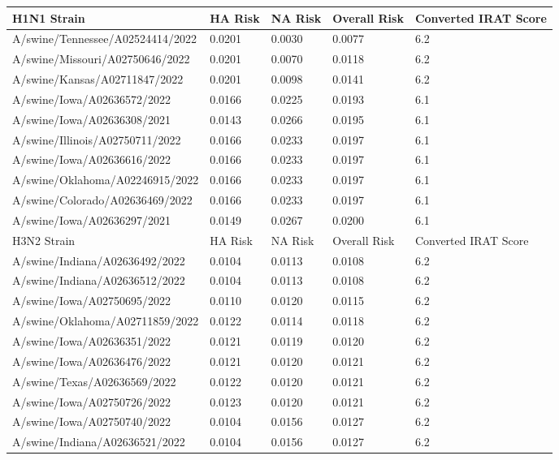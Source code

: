 \begin{tabular}{L{2.1in}|L{0.7in}|L{0.7in}|L{0.7in}|L{1in}}\hline
 H1N1 Strain & HA Risk & NA Risk & Overall Risk & Converted IRAT Score \\\hline
 A/swine/Tennessee/A02524414/2022 &0.0201&0.0030&0.0077&6.2\\\hline
 A/swine/Missouri/A02750646/2022 &0.0201&0.0070&0.0118&6.2\\\hline
 A/swine/Kansas/A02711847/2022 &0.0201&0.0098&0.0141&6.2\\\hline
 A/swine/Iowa/A02636572/2022 &0.0166&0.0225&0.0193&6.1\\\hline
 A/swine/Iowa/A02636308/2021 &0.0143&0.0266&0.0195&6.1\\\hline
 A/swine/Illinois/A02750711/2022 &0.0166&0.0233&0.0197&6.1\\\hline
 A/swine/Iowa/A02636616/2022 &0.0166&0.0233&0.0197&6.1\\\hline
 A/swine/Oklahoma/A02246915/2022 &0.0166&0.0233&0.0197&6.1\\\hline
 A/swine/Colorado/A02636469/2022 &0.0166&0.0233&0.0197&6.1\\\hline
 A/swine/Iowa/A02636297/2021 &0.0149&0.0267&0.0200&6.1\\\hline
 H3N2 Strain & HA Risk & NA Risk & Overall Risk & Converted IRAT Score\\\hline
 A/swine/Indiana/A02636492/2022 &0.0104&0.0113&0.0108&6.2\\\hline
 A/swine/Indiana/A02636512/2022 &0.0104&0.0113&0.0108&6.2\\\hline
 A/swine/Iowa/A02750695/2022 &0.0110&0.0120&0.0115&6.2\\\hline
 A/swine/Oklahoma/A02711859/2022 &0.0122&0.0114&0.0118&6.2\\\hline
 A/swine/Iowa/A02636351/2022 &0.0121&0.0119&0.0120&6.2\\\hline
 A/swine/Iowa/A02636476/2022 &0.0121&0.0120&0.0121&6.2\\\hline
 A/swine/Texas/A02636569/2022 &0.0122&0.0120&0.0121&6.2\\\hline
 A/swine/Iowa/A02750726/2022 &0.0123&0.0120&0.0121&6.2\\\hline
 A/swine/Iowa/A02750740/2022 &0.0104&0.0156&0.0127&6.2\\\hline
 A/swine/Indiana/A02636521/2022 &0.0104&0.0156&0.0127&6.2\\\hline
 \end{tabular}